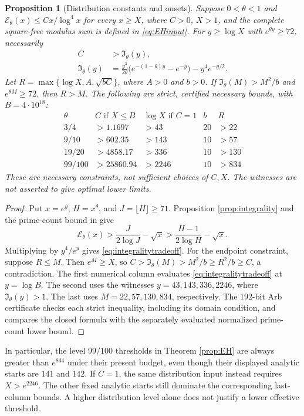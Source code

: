 \documentclass[11pt]{article}
\newtheorem{proposition}[theorem]{Proposition}
\begin{document}
\begin{proposition}[Distribution constants and onsets]\label{prop:tradeoff}
Suppose $0<\theta<1$ and
$\mathcal E_\theta(x)\le Cx/\log^4x$ for every $x\ge X$,
where $C>0$, $X>1$, and the complete square-free modulus sum is
defined in \eqref{eq:EHinput}.
For $y\ge\log X$ with $e^{\theta y}\ge72$, necessarily
\begin{equation}\label{eq:integralitytradeoff}
\begin{aligned}
C&>\mathfrak I_\theta(y),\\
\mathfrak I_\theta(y)
&=\frac{y^3}{2\theta}
 \bigl(e^{-(1-\theta)y}-e^{-y}\bigr)-y^4e^{-y/2}.
\end{aligned}
\end{equation}
Let
$R=\max\{\log X,A,\sqrt{bC}\}$, where $A>0$ and $b>0$.
If $\mathfrak I_\theta(M)>M^2/b$ and $e^{\theta M}\ge72$,
then $R>M$. The following are strict, certified necessary bounds,
with $B=4\cdot10^{18}$:
\[
\begin{array}{c|r|r|r|r}
\theta & C\text{ if }X\le B & \log X\text{ if }C=1 & b & R\\ \hline
3/4    & >1.1697    & >43   &20& >22\\
9/10   & >602.35    & >143  &10& >57\\
19/20  & >4858.17   & >336  &10& >130\\
99/100 & >25860.94  & >2246 &10& >834
\end{array}
\]
These are necessary constraints, not sufficient choices of $C,X$.
The witnesses are not asserted to give optimal lower limits.
\end{proposition}
\begin{proof}
Put $x=e^y$, $H=x^\theta$, and $J=\lfloor H\rfloor\ge71$.
Proposition \ref{prop:integrality} and the prime-count bound in
\cite[Lemma 3.1]{JS} give
\[
\mathcal E_\theta(x)>
\frac{J}{2\log J}-\sqrt x>
\frac{H-1}{2\log H}-\sqrt x.
\]
Multiplying by $y^4/e^y$ gives \eqref{eq:integralitytradeoff}.
For the endpoint constraint, suppose $R\le M$. Then $e^M\ge X$,
so $C>\mathfrak I_\theta(M)>M^2/b\ge R^2/b\ge C$, a contradiction.
The first numerical column evaluates \eqref{eq:integralitytradeoff}
at $y=\log B$. The second uses the witnesses $y=43,143,336,2246$,
where $\mathfrak I_\theta(y)>1$. The last uses
$M=22,57,130,834$, respectively. The 192-bit Arb certificate checks
each strict inequality, including its domain condition, and compares
the closed formula with the separately evaluated normalized
prime-count lower bound.
\end{proof}
In particular, the level $99/100$ thresholds in Theorem
\ref{prop:EH} are always greater than $e^{834}$ under their present
budget, even though their displayed analytic starts are $141$ and $142$.
If $C=1$, the same distribution input instead requires $X>e^{2246}$.
The other fixed analytic starts still dominate the corresponding
last-column bounds. A higher distribution level alone does not
justify a lower effective threshold.
\end{document}
